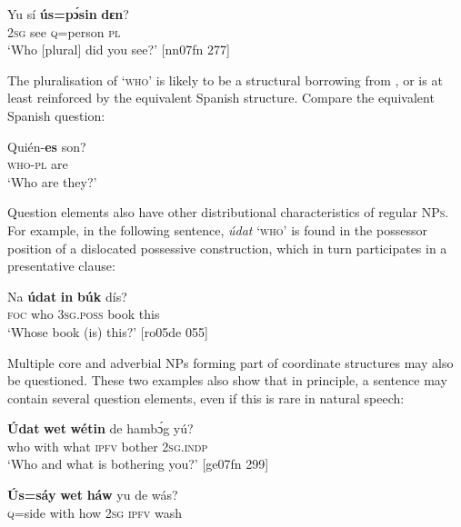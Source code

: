 \ea%
    \label{ex:key:586}
    \gll Yu  sí  \textbf{ús=pɔ́sin}    \textbf{dɛn}?\\
\textsc{2sg}  see  \textsc{q}=person    \textsc{pl}\\

\glt ‘Who [plural] did you see?’ [nn07fn 277]
\z

The pluralisation of ‘\textsc{who’} is likely to be a structural borrowing from , or is at least reinforced by the equivalent Spanish structure. Compare the equivalent Spanish question:


\ea%
    \label{ex:key:587}
    \gll Quién-\textbf{es}    son?\\
\textsc{who}{}-\textsc{pl}    are\\

\glt ‘Who are they?’
\z

Question elements also have other distributional characteristics of regular \textsc{NPs}. For example, in the following sentence, \textit{údat} ‘\textsc{who’} is found in the possessor position of a dislocated possessive construction, which in turn participates in a presentative clause: 


\ea%
    \label{ex:key:588}
    \gll Na  \textbf{údat}  \textbf{in}    \textbf{búk}    dís?\\
\textsc{foc}  who    \textsc{3sg.poss}  book  this\\

\glt ‘Whose book (is) this?’ [ro05de 055]
\z

Multiple core  and adverbial  \textsc{NP}s forming part of coordinate structures may also be questioned. These two examples also show that in principle, a sentence may contain several question elements, even if this is rare in natural speech:


\ea%
    \label{ex:key:589}
    \gll \textbf{\'{U}dat}  \textbf{wet}    \textbf{wétin}  de  hambɔ́g  yú?\\
who    with    what  \textsc{ipfv}  bother  \textsc{2sg.indp}\\

\glt ‘Who and what is bothering you?’ [ge07fn 299]
\z


\ea%
    \label{ex:key:590}
    \gll \textbf{\'{U}s=sáy}  \textbf{wet}    \textbf{háw}    yu  de  wás?\\
\textsc{q}=side  with    how    \textsc{2sg}  \textsc{ipfv}  wash\\

